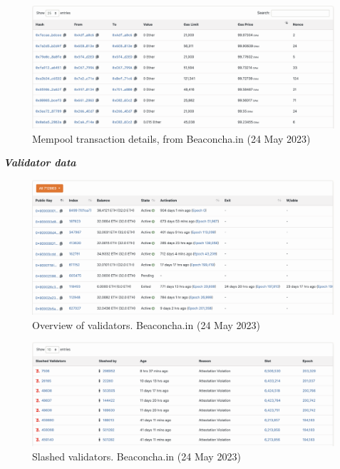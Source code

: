 \documentclass[UTF8]{article}
\begin{document}
{\begin{figure}[htbp]
\begin{center}
\includegraphics[width=0.9\linewidth]{images/bmempool}
\caption{Mempool transaction details, from Beaconcha.in (24 May 2023)}
\label{fig:bmempool}
\end{center}
\end{figure}
\clearpage


\textit{\textbf{Validator data}}
\begin{figure}[htbp]
\begin{center}
\includegraphics[width=0.9\linewidth]{images/bvalidators}
\caption{Overview of validators. Beaconcha.in (24 May 2023)}
\label{fig:bvalidators}
\end{center}
\end{figure}

\begin{figure}[htbp]
\begin{center}
\includegraphics[width=0.9\linewidth]{images/bslashed}
\caption{Slashed validators. Beaconcha.in (24 May 2023)}
\label{fig:bslashed}
\end{center}
\end{figure}

}
\end{document}
